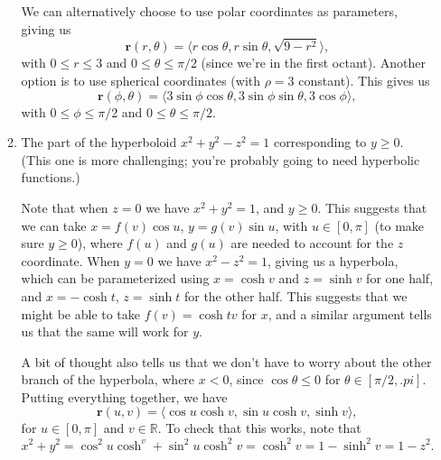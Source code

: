 \documentclass[12pt,letterpaper]{article}
\newcommand{\R}{\mathbb{R}}
\renewcommand{\r}{\mathbf{r}}
\begin{document}
\begin{enumerate}
\begin{enumerate}
We can alternatively choose to use polar coordinates as parameters, giving us
\[
\r(r,\theta) = \langle r\cos\theta, r\sin\theta, \sqrt{9-r^2}\rangle,
\]
with $0\leq r\leq 3$ and $0\leq \theta \leq \pi/2$ (since we're in the first octant). Another option is to use spherical coordinates (with $\rho = 3$ constant). This gives us
\[
\r(\phi,\theta) = \langle 3\sin\phi\cos\theta, 3\sin\phi\sin\theta, 3\cos\phi\rangle,
\]
with $0\leq \phi\leq \pi/2$ and $0\leq \theta\leq \pi/2$.


 \item The part of the hyperboloid $x^2+y^2-z^2=1$ corresponding to $y\geq 0$. (This one is more challenging; you're probably going to need hyperbolic functions.)
 
 \bigskip
 
 Note that when $z=0$ we have $x^2+y^2=1$, and $y\geq 0$. This suggests that we can take $x=f(v)\cos u$, $y=g(v)\sin u$, with $u\in [0,\pi]$ (to make sure $y\geq 0$), where $f(u)$ and $g(u)$ are needed to account for the $z$ coordinate. When $y=0$ we have $x^2-z^2=1$, giving us a hyperbola, which can be parameterized using $x=\cosh v$ and $z=\sinh v$ for one half, and $x=-\cosh t$, $z=\sinh t$ for the other half. This suggests that we might be able to take $f(v) = \cosh t v$ for $x$, and a similar argument tells us that the same will work for $y$. 
 
 A bit of thought also tells us that we don't have to worry about the other branch of the hyperbola, where $x<0$, since $\cos\theta\leq 0$ for $\theta \in [\pi/2, .pi]$. Putting everything together, we have
 \[
 \r(u,v) = \langle \cos u\cosh v, \sin u\cosh v, \sinh v\rangle,
 \]
 for $u\in [0,\pi]$ and $v\in\R$. To check that this works, note that
 \[
 x^2+y^2 = \cos^2u\cosh^v+\sin^2u\cosh^2v = \cosh^2v = 1-\sinh^2 v = 1-z^2.
 \]

\end{enumerate}
\end{enumerate}
\end{document}
